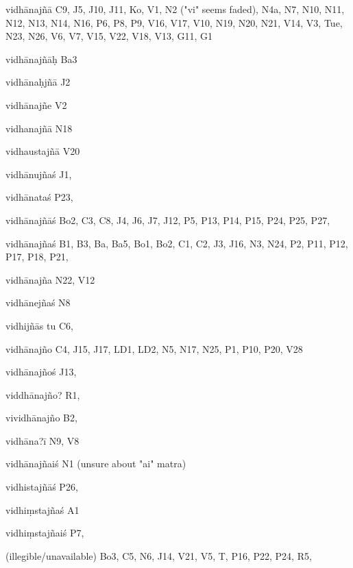 \begin{marma}[hp02_009]
\begin{marma}[hp02_011]
\begin{marma}[hp02_40c]
\begin{description}
    \end{description}
 \end{marma}

 \begin{marma}[hp02_43a]
\item[vidhānajñā] C9, J5, J10, J11, Ko, V1, N2 ("vi" seems faded), N4a, N7, N10, N11, N12, N13, N14, N16, P6, P8, P9, V16, V17, V10, N19, N20, N21, V14, V3, Tue, N23, N26, V6, V7, V15, V22, V18, V13, G11, G1
\item[vidhānajñāḥ] Ba3
\item[vidhānaḥjñā] J2
\item[vidhānajñe] V2
\item[vidhanajñā] N18
\item[vidhaustajñā] V20
\item[vidhānujñaś] J1,
\item[vidhānataś] P23, 
\item[vidhānajñāś] Bo2, C3, C8, J4, J6, J7, J12, P5, P13, P14, P15, P24, P25, P27, 
\item[vidhānajñaś] B1, B3, Ba, Ba5, Bo1, Bo2, C1, C2, J3, J16, N3, N24, P2, P11, P12, P17, P18, P21, 
\item[vidhānajña] N22, V12
\item[vidhānejñaś] N8
\item[vidhijñās tu] C6,
\item[vidhānajño] C4, J15, J17, LD1, LD2, N5, N17, N25, P1, P10, P20, V28
\item[vidhānajñoś] J13, 
\item[viddhānajño?] R1,
\item[vividhānajño] B2, 
\item[vidhāna?ī] N9, V8
\item[vidhānajñaiś] N1 (unsure about "ai" matra)
\item[vidhistajñāś] P26,
\item[vidhiṃstajñaś] A1
\item[vidhiṃstajñaiś] P7,
\item[(illegible/unavailable)] Bo3, C5, N6, J14, V21, V5, T, P16, P22, P24, R5,
  \begin{description}

    \end{description}
 \end{marma}


\end{marma}
\end{marma}
